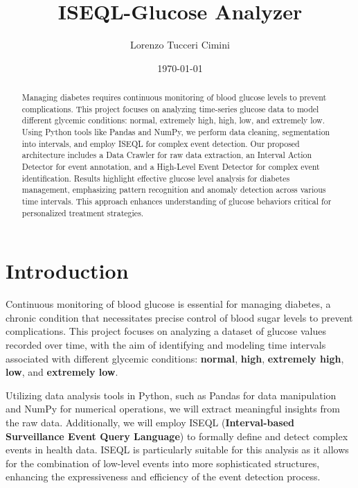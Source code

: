 \documentclass{article}
\title{ISEQL-Glucose Analyzer}
\author{Lorenzo Tucceri Cimini}
\date{\today}
\begin{document}
\maketitle

\begin{abstract}

Managing diabetes requires continuous monitoring of blood glucose levels to prevent complications. This project focuses on analyzing time-series glucose data to model different glycemic conditions: normal, extremely high, high, low, and extremely low. Using Python tools like Pandas and NumPy, we perform data cleaning, segmentation into intervals, and employ ISEQL for complex event detection. Our proposed architecture includes a Data Crawler for raw data extraction, an Interval Action Detector for event annotation, and a High-Level Event Detector for complex event identification. Results highlight effective glucose level analysis for diabetes management, emphasizing pattern recognition and anomaly detection across various time intervals. This approach enhances understanding of glucose behaviors critical for personalized treatment strategies.

\end{abstract}


\section{Introduction}

Continuous monitoring of blood glucose is essential for managing diabetes, a chronic condition that necessitates precise control of blood sugar levels to prevent complications. This project focuses on analyzing a dataset of glucose values recorded over time, with the aim of identifying and modeling time intervals associated with different glycemic conditions: \textbf{normal}, \textbf{high}, \textbf{extremely high}, \textbf{low}, and \textbf{extremely low}.

Utilizing data analysis tools in Python, such as Pandas for data manipulation and NumPy for numerical operations, we will extract meaningful insights from the raw data. Additionally, we will employ ISEQL (\textbf{Interval-based Surveillance Event Query Language}) to formally define and detect complex events in health data. ISEQL is particularly suitable for this analysis as it allows for the combination of low-level events into more sophisticated structures, enhancing the expressiveness and efficiency of the event detection process.
\end{document}
